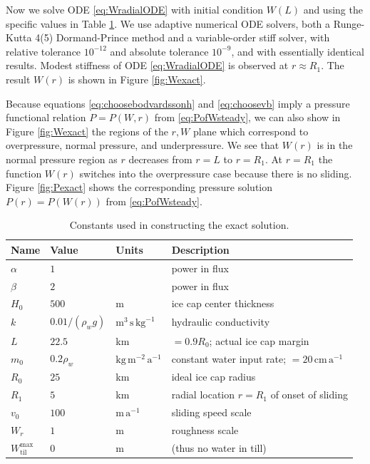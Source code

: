 \documentclass[gmd]{copernicus}   %
\newcommand{\text}{\textrm}
\newcommand{\Wtilmax}{W_{\text{til}}^{\text{max}}}
\begin{document}
Now we solve ODE \eqref{eq:WradialODE} with initial condition $W(L)$ and using the specific values in Table \ref{tab:verifconstants}.  We use adaptive numerical ODE solvers, both a Runge-Kutta 4(5) Dormand-Prince method and a variable-order stiff solver, with relative tolerance $10^{-12}$ and absolute tolerance $10^{-9}$, and with essentially identical results.  Modest stiffness \citep{AscherPetzold} of ODE \eqref{eq:WradialODE} is observed at $r\approx R_1$.  The result $W(r)$ is shown in Figure \ref{fig:Wexact}.

Because equations \eqref{eq:choosebodvardssonh} and \eqref{eq:choosevb} imply a pressure functional relation $P=P(W,r)$ from \eqref{eq:PofWsteady}, we can also show in Figure \ref{fig:Wexact} the regions of the $r,W$ plane which correspond to overpressure, normal pressure, and underpressure.  We see that $W(r)$ is in the normal pressure region as $r$ decreases from $r=L$ to $r=R_1$.  At $r=R_1$ the function $W(r)$ switches into the overpressure case because there is no sliding.  Figure \ref{fig:Pexact} shows the corresponding pressure solution $P(r)=P(W(r))$ from \eqref{eq:PofWsteady}.

\begin{table}[ht]
  \centering
  \caption{Constants used in constructing the exact solution.}
  \begin{tabular}{lllp{3.0in}}
    \textbf{Name} & \textbf{Value} & \textbf{Units} & \textbf{Description}\\
\hline
    $\alpha$ & $1$ & & power in flux \\
    $\beta$  & $2$ & & power in flux \\
    $H_0$ & $500$ & m & ice cap center thickness \\
    $k$   & $0.01/(\rho_w g)$ & $\text{m}^3\,\text{s}\,\text{kg}^{-1}$ & hydraulic conductivity \\
    $L$   & $22.5$& km & $=0.9 R_0$; actual ice cap margin \\
    $m_0$ & $0.2\rho_w$ & $\text{kg}\,\text{m}^{-2}\,\text{a}^{-1}$ & constant water input rate; $= 20 \,\text{cm}\,\text{a}^{-1}$ \\
    $R_0$ & $25$  & km & ideal ice cap radius \\
    $R_1$ & $5$   & km & radial location $r=R_1$ of onset of sliding \\
    $v_0$ & $100$ & $\text{m}\,\text{a}^{-1}$ & sliding speed scale \\
    $W_r$ & $1$ & m & roughness scale \\
    $\Wtilmax$ & 0 & m & (thus no water in till) \\
    \hline
  \end{tabular}
 \label{tab:verifconstants}
\end{table}
\end{document}
